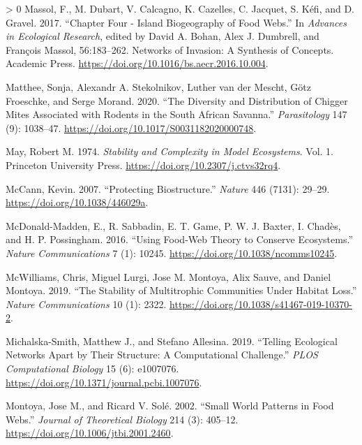 \documentclass[11pt]{article}
\newlength{\cslhangindent}
\newenvironment{CSLReferences}[3] %
 {%
  \setlength{\parindent}{0pt}
  \ifodd #1 \everypar{\setlength{\hangindent}{\cslhangindent}}\ignorespaces\fi
  \ifnum #2 > 0
  \setlength{\parskip}{#2\baselineskip}
  \fi
 }%
 {}
\begin{document}
\begin{CSLReferences}{1}{0}
\leavevmode\hypertarget{ref-Massol2017ChaFou}{}%
Massol, F., M. Dubart, V. Calcagno, K. Cazelles, C. Jacquet, S. Kéfi,
and D. Gravel. 2017. {``Chapter Four - Island Biogeography of Food
Webs.''} In \emph{Advances in Ecological Research}, edited by David A.
Bohan, Alex J. Dumbrell, and François Massol, 56:183--262. Networks of
Invasion: A Synthesis of Concepts. Academic Press.
\url{https://doi.org/10.1016/bs.aecr.2016.10.004}.

\leavevmode\hypertarget{ref-Matthee2020DivDis}{}%
Matthee, Sonja, Alexandr A. Stekolnikov, Luther van der Mescht, Götz
Froeschke, and Serge Morand. 2020. {``The Diversity and Distribution of
Chigger Mites Associated with Rodents in the South African Savanna.''}
\emph{Parasitology} 147 (9): 1038--47.
\url{https://doi.org/10.1017/S0031182020000748}.

\leavevmode\hypertarget{ref-May1974StaCom}{}%
May, Robert M. 1974. \emph{Stability and Complexity in Model
Ecosystems}. Vol. 1. Princeton University Press.
\url{https://doi.org/10.2307/j.ctvs32rq4}.

\leavevmode\hypertarget{ref-McCann2007ProBio}{}%
McCann, Kevin. 2007. {``Protecting Biostructure.''} \emph{Nature} 446
(7131): 29--29. \url{https://doi.org/10.1038/446029a}.

\leavevmode\hypertarget{ref-McDonald-Madden2016UsiFoo}{}%
McDonald-Madden, E., R. Sabbadin, E. T. Game, P. W. J. Baxter, I.
Chadès, and H. P. Possingham. 2016. {``Using Food-Web Theory to Conserve
Ecosystems.''} \emph{Nature Communications} 7 (1): 10245.
\url{https://doi.org/10.1038/ncomms10245}.

\leavevmode\hypertarget{ref-McWilliams2019StaMul}{}%
McWilliams, Chris, Miguel Lurgi, Jose M. Montoya, Alix Sauve, and Daniel
Montoya. 2019. {``The Stability of Multitrophic Communities Under
Habitat Loss.''} \emph{Nature Communications} 10 (1): 2322.
\url{https://doi.org/10.1038/s41467-019-10370-2}.

\leavevmode\hypertarget{ref-Michalska-Smith2019TelEco}{}%
Michalska-Smith, Matthew J., and Stefano Allesina. 2019. {``Telling
Ecological Networks Apart by Their Structure: A Computational
Challenge.''} \emph{PLOS Computational Biology} 15 (6): e1007076.
\url{https://doi.org/10.1371/journal.pcbi.1007076}.

\leavevmode\hypertarget{ref-Montoya2002SmaWor}{}%
Montoya, Jose M., and Ricard V. Solé. 2002. {``Small World Patterns in
Food Webs.''} \emph{Journal of Theoretical Biology} 214 (3): 405--12.
\url{https://doi.org/10.1006/jtbi.2001.2460}.


\end{CSLReferences}
\end{document}
